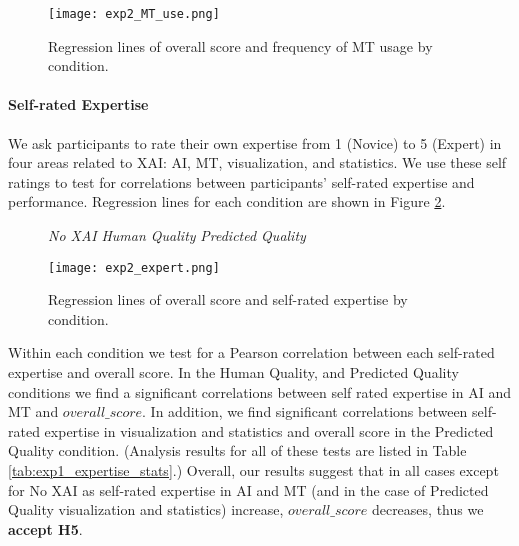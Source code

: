 \begin{figure}[h!]
    \centering
    \texttt{[image: exp2\_MT\_use.png]}
    \caption{Regression lines of overall score and frequency of MT usage by condition.}
    \label{fig:exp_MT_use}
\end{figure}

\paragraph{Self-rated Expertise}

We ask participants to rate their own expertise from 1 (Novice) to 5 (Expert) in four areas related to XAI: AI, MT, visualization, and statistics. We use these self ratings to test for correlations between participants’ self-rated expertise and performance. Regression lines for each condition are shown in Figure \ref{fig:exp_expert}.  

\begin{figure}[h!]
    \centering
    
     \textit{No XAI} \quad
     \textit{Human Quality} \quad
     \textit{Predicted Quality} \quad
    
    \texttt{[image: exp2\_expert.png]}
    \caption{Regression lines of overall score and self-rated expertise by condition.}
    \label{fig:exp_expert}
\end{figure}

Within each condition we test for a Pearson correlation between each self-rated expertise and overall score. In the Human Quality, and Predicted Quality conditions we find a significant correlations between self rated expertise in AI and MT and $overall\_score$. In addition, we find significant correlations between self-rated expertise in visualization and statistics and overall score in the Predicted Quality condition.  
(Analysis results for all of these tests are listed in Table \ref{tab:exp1_expertise_stats}.) Overall, our results suggest that in all cases except for No XAI as self-rated expertise in AI and MT (and in the case of Predicted Quality visualization and statistics) increase, $overall\_score$ decreases, thus we \textbf{accept H5}.


